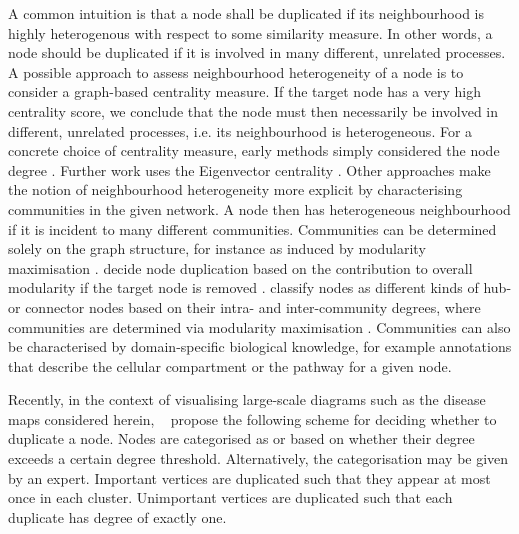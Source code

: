 \documentclass[
	fontsize=10pt, %
	twoside=false, %
	secnumdepth=1, %
  toc=indentunnumbered %
]{kaobook}
\begin{document}
A common intuition is that a node shall be duplicated if its neighbourhood is
highly heterogenous with respect to some similarity measure. In other words, a
node should be duplicated if it is involved in many different, unrelated
processes.
%
A possible approach to assess neighbourhood heterogeneity of a node is to
consider a graph-based centrality measure. If the target node has a very high
centrality score, we conclude that the node must then necessarily be involved in
different, unrelated processes, i.e. its neighbourhood is heterogeneous. For a
concrete choice of centrality measure, early methods simply considered the node
degree \cite{ma_ReconstructionMetabolicNetworks_2003,schuster_exploring_2002}.
Further work uses the Eigenvector centrality \cite{manipur_clustering_2020}.
%
Other approaches make the notion of neighbourhood heterogeneity more explicit by
characterising communities in the given network. A node then has heterogeneous
neighbourhood if it is incident to many different communities. Communities can
be determined solely on the graph structure, for instance as induced by
modularity maximisation \cite{newman_modularity_2006}.
\citeauthor{huss_CurrencyCommodityMetabolites_2007} decide node duplication
based on the contribution to overall modularity if the target node is removed
\cite{huss_CurrencyCommodityMetabolites_2007}.
\citeauthor{guimera_FunctionalCartographyComplex_2005} classify nodes as
different kinds of hub- or connector nodes based on their intra- and
inter-community degrees, where communities are determined via modularity
maximisation \cite{guimera_FunctionalCartographyComplex_2005}. Communities can
also be characterised by domain-specific biological knowledge, for example
annotations that describe the cellular compartment
\cite{manipur_clustering_2020} or the pathway
\cite{rohrschneider_NovelGridBasedVisualization_2010,
  joshi-tope_ReactomeKnowledgebaseBiological_2005} for a given node.

Recently, in the context of visualising large-scale diagrams such as the disease
maps considered herein,
\citeauthor{wu_MultilevelAreaBalancing_2020}~\cite{wu_MultilevelAreaBalancing_2020}
propose the following scheme for deciding whether to duplicate a node. Nodes are
categorised as  or  based on whether their
degree exceeds a certain degree threshold. Alternatively, the categorisation may
be given by an expert.
% 
Important vertices are duplicated such that they appear at most once in each
cluster. Unimportant vertices are duplicated such that each duplicate has degree
of exactly one.
\end{document}
